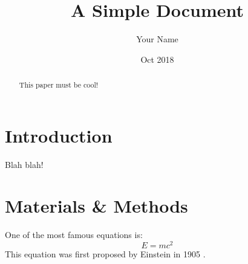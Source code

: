\documentclass[12pt]{article}
\title{A Simple Document}
\author{Your Name}
\date{Oct 2018}
\begin{document}
\maketitle

\begin{abstract}
This paper must be cool!
\end{abstract}

\section{Introduction}
Blah blah!

\section{Materials \& Methods}
One of the most famous equations is:
\begin{equation}
E = mc^2
\end{equation}
This equation was first proposed by Einstein in 1905 \cite{einstein1905does}.



\end{document}
